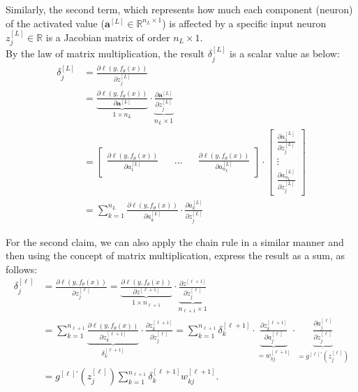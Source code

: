 Similarly, the second term, which represents how much each component (neuron) of the activated value ($\boldsymbol{a}^{[L]} \in \mathbb{R}^{n_L \times 1}$) is affected by a specific input neuron $z_j^{[L]} \in \mathbb{R}$ is a Jacobian matrix of order $n_L \times 1$.\\

By the law of matrix multiplication, the result $\delta_j^{[L]}$ is a scalar value as below:
\begin{equation}
    \begin{aligned}
    \delta_j^{[L]} &= \frac{\partial \ell(y, f_\theta(x))}{\partial z_j^{[L]}}\\
    &= \underbrace{\frac{\partial \ell(y, f_\theta(x))}{\partial \boldsymbol{a}^{[L]}}}_{1 \times n_L} \cdot \underbrace{\frac{\partial \boldsymbol{a}^{[L]}}{\partial z_j^{[L]}}}_{n_L \times 1}\\
    &= \begin{bmatrix}
        \frac{\partial \ell(y, f_\theta(x))}{\partial a_1^{[L]}} && \ldots && \frac{\partial \ell(y, f_\theta(x))}{\partial a_{n_L}^{[L]}}
    \end{bmatrix} \cdot \begin{bmatrix}
        \frac{\partial a_1^{[L]}}{\partial z_j^{[L]}} \\
        \vdots\\
        \frac{\partial a_{n_L}^{[L]}}{\partial z_j^{[L]}}
    \end{bmatrix}\\
    &= \sum_{k=1}^{n_L} \frac{\partial \ell(y, f_\theta(x))}{\partial a_k^{[L]}} \cdot \frac{\partial a_k^{[L]}}{\partial z_j^{[L]}}
    \end{aligned}
    \label{eqn:65}
\end{equation}

For the second claim, we can also apply the chain rule in a similar manner and then using the concept of matrix multiplication, express the result as a sum, as follows:
\begin{equation}
    \begin{aligned}
    \delta_{j}^{[\ell]} &= \frac{\partial \ell (y, f_{\theta} (x))}{\partial z_{j}^{[\ell]}} = \underbrace{\frac{\partial \ell (y, f_{\theta} (x))}{\partial z^{[\ell+1]}}}_{1 \times n_{\ell + 1}} \cdot \underbrace{\frac{\partial z^{[\ell+1]}}{\partial z_{j}^{[\ell]}}}_{n_{\ell + 1} \times 1}\\
    &= \sum_{k=1}^{n_{\ell+1}} \underbrace{\frac{\partial \ell (y, f_\theta (x))}{\partial z_{k}^{[\ell+1]}}}_{\delta_k^{[\ell + 1]}} \cdot \frac{\partial z_{k}^{[\ell+1]}}{\partial z_{j}^{[\ell]}} = \sum_{k=1}^{n_{\ell+1}} \delta_{k}^{[\ell+1]} \cdot \underbrace{\frac{\partial z_{k}^{[\ell+1]}}{\partial a_{j}^{[\ell]}}}_{=w_{kj}^{[\ell + 1]}} \cdot \underbrace{\frac{\partial a_{j}^{[\ell]}}{\partial z_{j}^{[\ell]}}}_{=g^{[\ell]'} \left( z_{j}^{[\ell]} \right)}\\
    &= g^{[\ell]'} \left( z_{j}^{[\ell]} \right) \sum_{k=1}^{n_{\ell+1}} \delta_{k}^{[\ell+1]} w_{kj}^{[\ell+1]}.
    \end{aligned}
    \label{eqn:66}
\end{equation}

